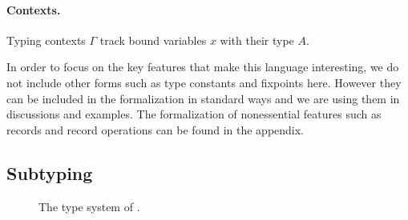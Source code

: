 \paragraph{Contexts.} Typing contexts $ \Gamma $ track bound variables $x$ with their type $A$.


In order to focus on the key features that make this language interesting, we do
not include other forms such as type constants and fixpoints here. However they
can be included in the formalization in standard ways and we are using them in
discussions and examples. The formalization of nonessential features such as
records and record operations can be found in the appendix.


\subsection{Subtyping}


\begin{figure}



  \caption{The type system of \name.}
  \label{fig:fi-type}
\end{figure}

